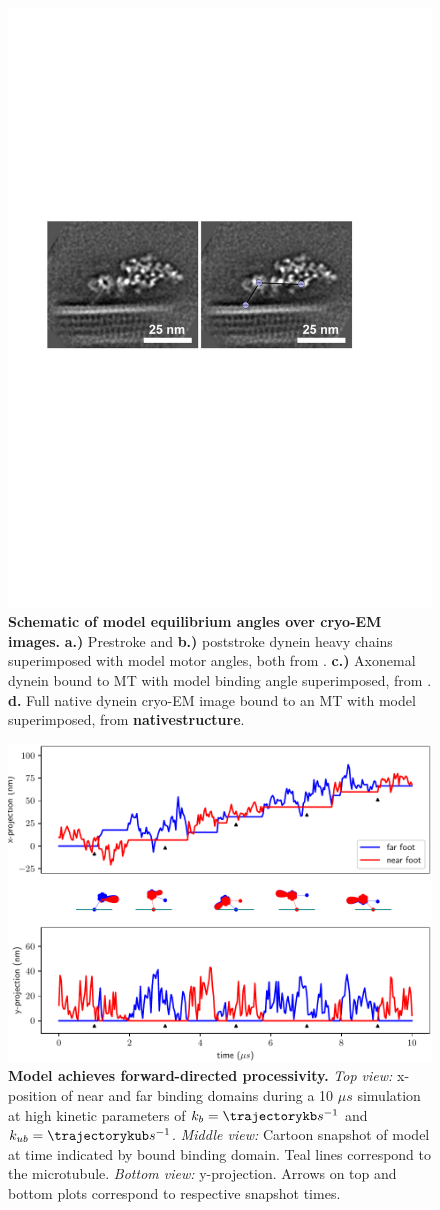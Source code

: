 \documentclass[9pt,twocolumn,twoside]{pnas-new}
\begin{document}
\begin{figure}[tbhp]
\includegraphics[width=0.5\columnwidth]{figures/schematic-full}
  \caption{\textbf{Schematic of model equilibrium angles over cryo-EM
      images.} \textbf{a.)} Prestroke and \textbf{b.)} poststroke
    dynein heavy chains superimposed with model motor angles, both
    from \cite{burgess-paper}. \textbf{c.)} Axonemal dynein bound to
    MT with model binding angle superimposed, from
    \cite{leschziner}. \textbf{d.} Full native dynein cryo-EM image
    bound to an MT with model superimposed, from
    \textbf{nativestructure}.}
\label{fig:modelangles}
\end{figure}

\begin{figure}[tbhp]
\centering
\includegraphics[width=\linewidth]{../../plots/paper_trajectory_plot.pdf}
\caption{\textbf{Model achieves forward-directed processivity.} \textit{Top view:} x-position of near and far binding domains during a 10 $\mu s$ simulation at high kinetic parameters of $k_b = \trajectorykb s^{-1}$ and $k_{ub} = \trajectorykub s^{-1}$. \textit{Middle view:} Cartoon snapshot of model at time indicated by bound binding domain. Teal lines correspond to the microtubule. \textit{Bottom view:} y-projection. Arrows on top and bottom plots correspond to respective snapshot times.}
\label{fig:trajectory}
\end{figure}
\end{document}
